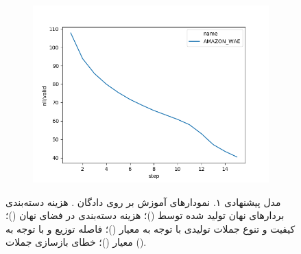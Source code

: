 \begin{figure}[h]
    \begin{subfigure}{0.3\textheight}
        \centering
        \includegraphics[width=1.\textwidth]{images/figs2/2020_01_15__11_37_34__nll.png}
        \caption{}
        \label{fig:chap4:amazon_nll}
    \end{subfigure}
    \caption{
        مدل پیشنهادی ۱.
        نمودار‌های آموزش \wae{} بر روی دادگان \amazon{}.
        هزینه دسته‌بندی بردار‌های نهان تولید شده توسط \encoder{}
        ()؛
        هزینه دسته‌بندی \classifier{} در فضای نهان
        ()؛
        کیفیت و تنوع جملات تولیدی با توجه به معیار \jaccard{}
        ()؛
        فاصله توزیع \marginal{} \encoder{} و \priordist{} با توجه به معیار \mmd{}
        ()؛
        خطای بازسازی جملات
        ().
    }
    \label{fig:chap4:amazon_cond}
\end{figure}


